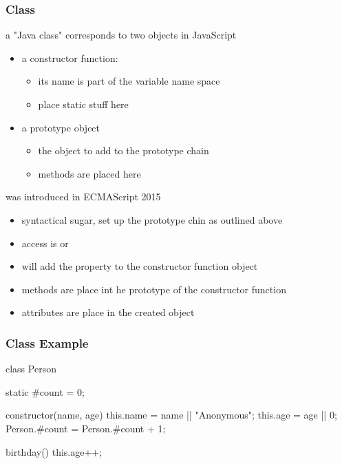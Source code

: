 \begin{frame}[fragile] \frametitle{Class}
a "Java class" corresponds to two objects in JavaScript
\begin{itemize}
  \item a constructor function:
  \begin{itemize}
    \item its name is part of the variable name space
    \item place static stuff here
  \end{itemize}
  \item a prototype object
  \begin{itemize}
    \item the object to add to the prototype chain
    \item methods are placed here
  \end{itemize}
\end{itemize}
\vspace{5mm}

 was introduced in ECMAScript 2015
\begin{itemize}
  \item syntactical sugar, set up the prototype chin as outlined above
  \item access is  or 
  \item {} will add the property to the constructor function object
  \item methods are place int he prototype of the constructor function
  \item attributes are place in the created object
\end{itemize}
\end{frame}
\begin{frame}[fragile] \frametitle{Class Example}
\begin{CodeBox}{}
class Person {
  static #count = 0;

  constructor(name, age) {
    this.name = name || "Anonymous";
    this.age = age || 0;
    Person.#count = Person.#count + 1;
  }

  birthday() {
    this.age++;
  }
}
\end{CodeBox}
\end{frame}

